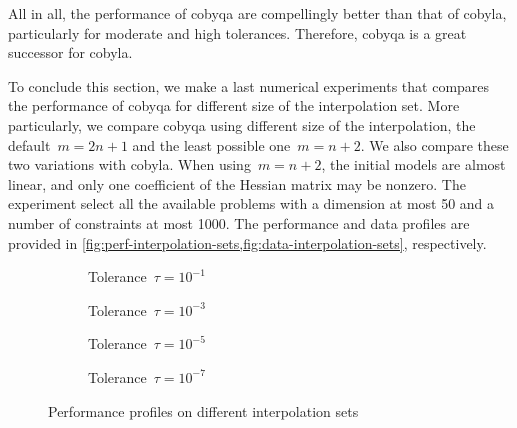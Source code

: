All in all, the performance of \gls{cobyqa} are compellingly better than that of \gls{cobyla}, particularly for moderate and high tolerances.
Therefore, \gls{cobyqa} is a great successor for \gls{cobyla}.

To conclude this section, we make a last numerical experiments that compares the performance of \gls{cobyqa} for different size of the interpolation set.
More particularly, we compare \gls{cobyqa} using different size of the interpolation, the default~$m = 2n + 1$ and the least possible one~$m = n + 2$.
We also compare these two variations with \gls{cobyla}.
When using~$m = n + 2$, the initial models are almost linear, and only one coefficient of the Hessian matrix may be nonzero.
The experiment select all the available problems with a dimension at most \num{50} and a number of constraints at most \num[group-minimum-digits=4]{1000}.
The performance and data profiles are provided in \cref{fig:perf-interpolation-sets,fig:data-interpolation-sets}, respectively.

\begin{figure}[ht]
    \centering
    \begin{subfigure}[b]{0.49\textwidth}
        \centering
        \caption{Tolerance~$\tau = 10^{-1}$}
    \end{subfigure}
    \hfill
    \begin{subfigure}[b]{0.49\textwidth}
        \centering
        \caption{Tolerance~$\tau = 10^{-3}$}
    \end{subfigure}
    \begin{subfigure}[b]{0.49\textwidth}
        \centering
        \caption{Tolerance~$\tau = 10^{-5}$}
    \end{subfigure}
    \hfill
    \begin{subfigure}[b]{0.49\textwidth}
        \centering
        \caption{Tolerance~$\tau = 10^{-7}$}
    \end{subfigure}
    \caption{Performance profiles on different interpolation sets}
    \label{fig:perf-interpolation-sets}
\end{figure}

